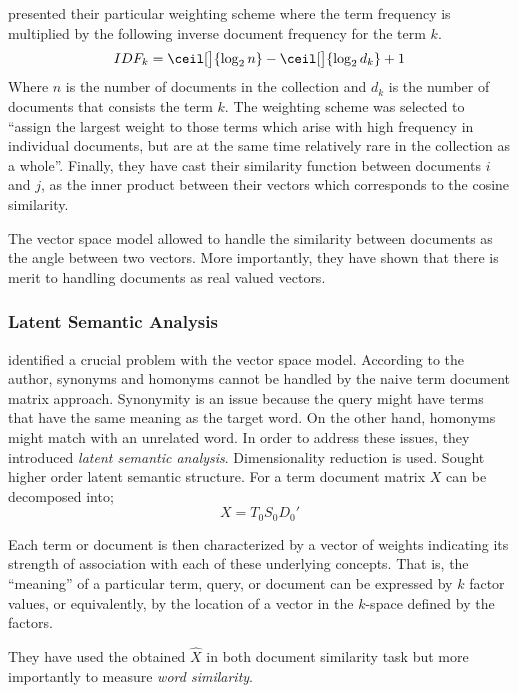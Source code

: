 \citeauthor{salton_vector_1975} presented their particular weighting scheme where the term frequency is multiplied by the following inverse document frequency for the term $k$.
\begin{displaymath}
IDF_{k} = \ceil[\big]{\log_{2}n} - \ceil[\big]{\log_{2}d_{k}} + 1
\end{displaymath}
Where $n$ is the number of documents in the collection and $d_k$ is the number of documents that consists the term $k$.
The weighting scheme was selected to \enquote{assign the largest weight to those terms which arise with high frequency in individual documents, but are at the same time relatively rare in the collection as a whole}.
Finally, they have cast their similarity function between documents $i$ and $j$, as the inner product between their vectors which corresponds to the cosine similarity.

The vector space model allowed \citeauthor{salton_vector_1975} to handle the similarity between documents as the angle between two vectors.
More importantly, they have shown that there is merit to handling documents as real valued vectors.

\subsubsection{Latent Semantic Analysis}%
\label{ssub:latent_semantic_analysis}

\textcite{deerwester_indexing_1990} identified a crucial problem with the vector space model.
According to the author, synonyms and homonyms cannot be handled by the naive term document matrix approach.
Synonymity is an issue because the query might have terms that have the same meaning as the target word.
On the other hand, homonyms might match with an unrelated word.
In order to address these issues, they introduced \emph{latent semantic analysis}.
Dimensionality reduction is used.
Sought higher order latent semantic structure.
For a term document matrix $X$ can be decomposed into;
\begin{displaymath}
    X = T_{0}S_{0}D_{0}'
\end{displaymath}

\begin{displayquote}
Each term or document is then characterized by a vector of weights indicating its strength of association with each of these underlying concepts.
That is, the \enquote{meaning} of a particular term, query, or document can be expressed by $k$ factor values, or equivalently, by the location of a vector in the $k$-space defined by the factors.
\end{displayquote}
They have used the obtained $\hat{X}$ in both document similarity task but more importantly to measure \emph{word similarity}.

